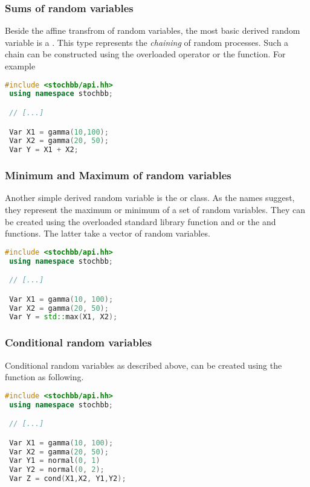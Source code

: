 \subsubsection{Sums of random variables}
Beside the affine transfrom of random variables, the most basic derived random variable is a .
This type represents the \emph{chaining} of random processes. Such a chain can be constructed using 
the overloaded \code{+} operator or the  function. For example
\begin{lstlisting}[language=C++]
 #include <stochbb/api.hh>
 using namespace stochbb;

 // [...]

 Var X1 = gamma(10,100);
 Var X2 = gamma(20, 50);
 Var Y = X1 + X2;
\end{lstlisting}

\subsubsection{Minimum and Maximum of random variables}
Another simple derived random variable is the  or  class. As the
names suggest, they represent the maximum or minimum of a set of random variables. They can be
created using the overloaded standard library function  and  or the
 and  functions. The latter take a vector of random variables.
\begin{lstlisting}[language=C++]
 #include <stochbb/api.hh>
 using namespace stochbb;

 // [...]

 Var X1 = gamma(10, 100);
 Var X2 = gamma(20, 50);
 Var Y = std::max(X1, X2);
\end{lstlisting}

\subsubsection{Conditional random variables}
Conditional random variables as described above, can be created using the 
function  as following. 
\begin{lstlisting}[language=C++]
 #include <stochbb/api.hh>
 using namespace stochbb;

 // [...]

 Var X1 = gamma(10, 100);
 Var X2 = gamma(20, 50);
 Var Y1 = normal(0, 1)
 Var Y2 = normal(0, 2);
 Var Z = cond(X1,X2, Y1,Y2);
\end{lstlisting}

